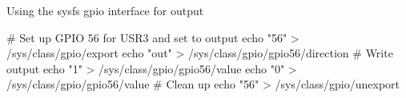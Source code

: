 \begin{frame}
   {Using the sysfs gpio interface for output}
   \begin{raw}
# Set up GPIO 56 for USR3 and set to output
echo "56" > /sys/class/gpio/export
echo "out" > /sys/class/gpio/gpio56/direction
# Write output
echo "1" > /sys/class/gpio/gpio56/value
echo "0" > /sys/class/gpio/gpio56/value
# Clean up
echo "56" > /sys/class/gpio/unexport
   \end{raw}
\end{frame}

\cprotect\note{


}

